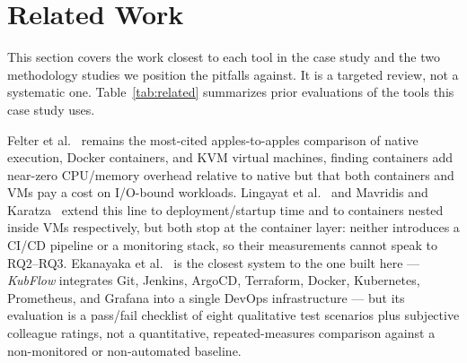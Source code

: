 \documentclass[conference]{IEEEtran}
\begin{document}
\section{Related Work}

This section covers the work closest to each tool in the case study and the two
methodology studies we position the pitfalls against. It is a targeted review, not a
systematic one. Table~\ref{tab:related} summarizes prior evaluations of the tools this
case study uses.

Felter et al.~\cite{felter2015} remains the most-cited apples-to-apples
comparison of native execution, Docker containers, and KVM virtual machines,
finding containers add near-zero CPU/memory overhead relative to native but
that both containers and VMs pay a cost on I/O-bound workloads. Lingayat et
al.~\cite{lingayat2018} and Mavridis and Karatza~\cite{mavridis2017} extend
this line to deployment/startup time and to containers nested inside VMs
respectively, but both stop at the container layer: neither introduces a
CI/CD pipeline or a monitoring stack, so their measurements cannot speak to
RQ2--RQ3. Ekanayaka et al.~\cite{ekanayaka2023} is the closest system to the
one built here --- \emph{KubFlow} integrates Git, Jenkins, ArgoCD, Terraform,
Docker, Kubernetes, Prometheus, and Grafana into a single DevOps
infrastructure --- but its evaluation is a pass/fail checklist of eight
qualitative test scenarios plus subjective colleague ratings, not a
quantitative, repeated-measures comparison against a non-monitored or
non-automated baseline.
\end{document}

